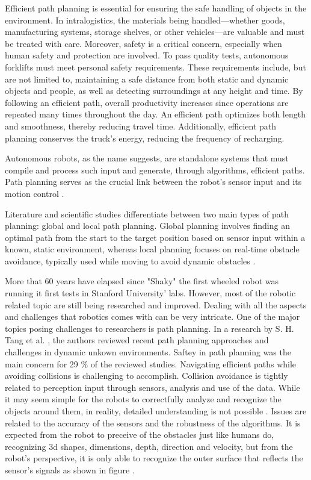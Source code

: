 Efficient path planning is essential for ensuring the safe handling of objects in the environment. 
In intralogistics, the materials being handled—whether goods, manufacturing systems, storage 
shelves, or other vehicles—are valuable and must be treated with care. Moreover, safety is a 
critical concern, especially when human safety and protection are involved. To pass quality 
tests, autonomous forklifts must meet personal safety requirements. These requirements include, 
but are not limited to, maintaining a safe distance from both static and dynamic objects and 
people, as well as detecting surroundings at any height and time. By following an efficient 
path, overall productivity increases since operations are repeated many times throughout the 
day. An efficient path optimizes both length and smoothness, thereby reducing travel time. 
Additionally, efficient path planning conserves the truck's energy, reducing the frequency of recharging.

Autonomous robots, as the name suggests, are 
standalone systems that must compile and process such input and generate, through algorithms, 
efficient paths. Path planning serves as the crucial 
link between the robot’s sensor input and its motion control \cite{R10}.

Literature and scientific studies differentiate between two main types of path planning: 
global and local path planning. Global planning involves finding an optimal path from 
the start to the target position based on sensor input within a known, static environment, 
whereas local planning focuses on real-time obstacle avoidance, typically used while 
moving to avoid dynamic obstacles \cite{R11}.

More that 60 years have elapsed since "Shaky" the first wheeled robot was running it first tests
in Stanford University' labs. However, most of the robotic related topic are still being researched and improved.
Dealing with all the aspects and challenges that robotics comes with can be very intricate. One of the major 
topics posing challenges to researchers is path planning. 
In a research by S. H. Tang et al. \cite{R20}, the authors reviewed recent path planning approaches and challenges
in dynamic unkown environments. 
Saftey in path planning was the main concern for 29 \% of the reviewed studies. Navigating efficient 
paths while avoiding collisions is challenging to accomplish. Collision avoidance is tightly related to perception 
input through sensors, analysis and use of the data. While it may seem simple for the robots to correctfully analyze 
and recognize the objects around them, in reality, detailed understanding is not possible \cite{R21}. Issues are 
related to the accuracy of the sensors and the robustness of the algorithms. 
It is expected from the robot to 
preceive of the obstacles just like humans do, recognizing 3d shapes, dimensions, depth, direction and velocity, 
but from the 
robot's perspective, it is only able to recognize the outer surface that reflects the sensor's signals as shown in
figure .

